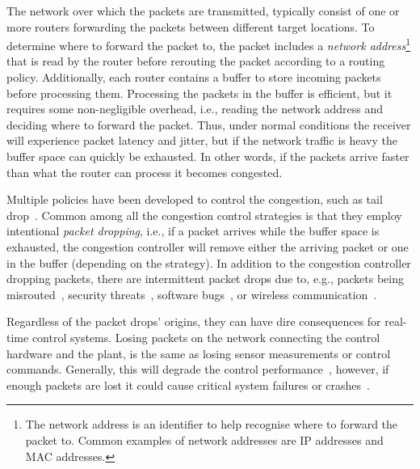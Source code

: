 The network over which the packets are transmitted, typically consist of one or more routers forwarding the packets between different target locations.
To determine where to forward the packet to, the packet includes a \emph{network address}\footnote{The network address is an identifier to help recognise where to forward the packet to. Common examples of network addresses are IP addresses and MAC addresses.} that is read by the router before rerouting the packet according to a routing policy.
Additionally, each router contains a buffer to store incoming packets before processing them.
Processing the packets in the buffer is efficient, but it requires some non-negligible overhead, i.e., reading the network address and deciding where to forward the packet.
Thus, under normal conditions the receiver will experience packet latency and jitter, but if the network traffic is heavy the buffer space can quickly be exhausted.
In other words, if the packets arrive faster than what the router can process it becomes congested.

Multiple policies have been developed to control the congestion, such as tail drop~\cite{Comer:2013}.
Common among all the congestion control strategies is that they employ intentional \emph{packet dropping}, i.e., if a packet arrives while the buffer space is exhausted, the congestion controller will remove either the arriving packet or one in the buffer (depending on the strategy).
In addition to the congestion controller dropping packets, there are intermittent packet drops due to, e.g., packets being misrouted~\cite{Bradley:1998}, security threats~\cite{Hansman:2005}, software bugs~\cite{Mai:2011}, or wireless communication~\cite{Zhu:2021}.

Regardless of the packet drops' origins, they can have dire consequences for real-time control systems.
Losing packets on the network connecting the control hardware and the plant, is the same as losing sensor measurements or control commands.
Generally, this will degrade the control performance~\cite{Nilsson:1998b}, however, if enough packets are lost it could cause critical system failures or crashes~\cite{Xiong:2007}.

